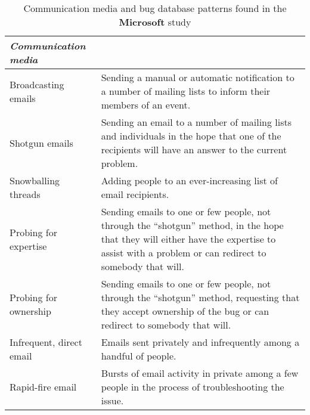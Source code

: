 \begin{table}[tbp]
\caption{\label{tab:MicrosoftPatterns1} Communication media and bug database patterns found in the \textbf{Microsoft} study}
\centering
\footnotesize{\begin{tabular}{p{2.4cm}p{12.2cm}}
\hline \hline
\vspace{1pt} \bfseries \emph{Communication media} & \vspace{1pt} \\
\hline
\vspace{0.5pt} Broadcasting emails & \vspace{0.5pt} Sending a manual or automatic notification to a number of mailing lists to inform their members of an event. \\
\hline
\vspace{0.5pt} Shotgun emails & \vspace{0.5pt} Sending an email to a number of mailing lists and individuals in the hope that one of the recipients will have an answer to the current problem. \\
\hline
\vspace{0.5pt} Snowballing threads & \vspace{0.5pt} Adding people to an ever-increasing list of email recipients. \\
\hline
\vspace{0.5pt} Probing for expertise & \vspace{0.5pt} Sending emails to one or few people, not through the ``shotgun'' method, in the hope that they will either have the expertise to assist with a problem or can redirect to somebody that will. \\
\hline
\vspace{0.5pt} Probing for ownership & \vspace{0.5pt} Sending emails to one or few people, not through the ``shotgun'' method, requesting that they accept ownership of the bug or can redirect to somebody that will. \\
\hline
\vspace{0.5pt} Infrequent, direct email & \vspace{0.5pt} Emails sent privately and infrequently among a handful of people. \\
\hline
\vspace{0.5pt} Rapid-fire email & \vspace{0.5pt} Bursts of email activity in private among a few people in the process of troubleshooting the issue. \\
\hline

\end{tabular}}
\end{table}
